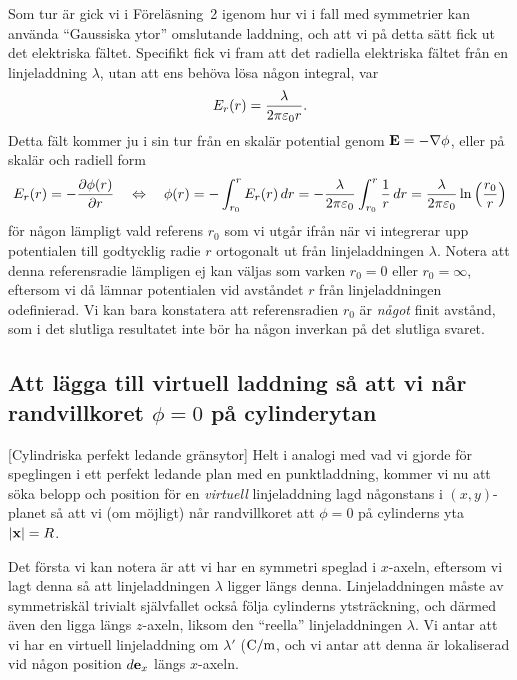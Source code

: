 {Som tur {\"a}r gick vi i F{\"o}rel{\"a}sning~2 igenom hur vi i fall med
symmetrier kan anv{\"a}nda ``Gaussiska ytor'' omslutande laddning, och att vi
p{\aa} detta s{\"a}tt fick ut det elektriska f{\"a}ltet. Specifikt fick vi fram
att det radiella elektriska f{\"a}ltet fr{\aa}n en linjeladdning $\lambda$,
utan att ens beh{\"o}va l{\"o}sa n{\aa}gon integral, var
$$
  E_r(r) = {{\lambda}\over{2\pi \varepsilon_0 r}}.
$$
Detta f{\"a}lt kommer ju i sin tur fr{\aa}n en skal{\"a}r potential genom
${\bf E}=-\nabla\phi$, eller p{\aa} skal{\"a}r och radiell form
$$
  E_r(r)=-{{\partial\phi(r)}\over{\partial r}}
    \quad\Leftrightarrow\quad
    \phi(r)=-\int^r_{r_0}E_r(r)\,dr
    =-{{\lambda}\over{2\pi \varepsilon_0}}\int^r_{r_0}{{1}\over{r}}\,dr
    ={{\lambda}\over{2\pi \varepsilon_0}}\ln\Big({{r_0}\over{r}}\Big)
$$
f{\"o}r n{\aa}gon l{\"a}mpligt vald referens $r_0$ som vi utg{\aa}r ifr{\aa}n
n{\"a}r vi integrerar upp potentialen till godtycklig radie $r$ ortogonalt ut
fr{\aa}n linjeladdningen $\lambda$. Notera att denna referensradie l{\"a}mpligen
ej kan v{\"a}ljas som varken $r_0=0$ eller $r_0=\infty$, eftersom vi d{\aa}
l{\"a}mnar potentialen vid avst{\aa}ndet $r$ fr{\aa}n linjeladdningen
odefinierad. Vi kan bara konstatera att referensradien $r_0$ {\"a}r
{\it n{\aa}got} finit avst{\aa}nd, som i det slutliga resultatet inte
b{\"o}r ha n{\aa}gon inverkan p{\aa} det slutliga svaret.

\subsection{Att l{\"a}gga till virtuell laddning s{\aa} att vi n{\aa}r
  randvillkoret $\phi=0$ p{\aa} cylinderytan}
[Cylindriska perfekt ledande gr{\"a}nsytor]
Helt i analogi med vad vi gjorde f{\"o}r speglingen i ett perfekt ledande plan
med en punktladdning, kommer vi nu att s{\"o}ka belopp och position f{\"o}r en
{\it virtuell} linjeladdning lagd n{\aa}gonstans i $(x,y)$-planet s{\aa} att vi
(om m{\"o}jligt) n{\aa}r randvillkoret att $\phi=0$ p{\aa} cylinderns yta
$|{\bf x}|=R$.

Det f{\"o}rsta vi kan notera {\"a}r att vi har en symmetri speglad i $x$-axeln,
eftersom vi lagt denna s{\aa} att linjeladdningen $\lambda$ ligger l{\"a}ngs
denna.
Linjeladdningen m{\aa}ste av symmetrisk{\"a}l trivialt sj{\"a}lvfallet ocks{\aa}
f{\"o}lja cylinderns ytstr{\"a}ckning, och d{\"a}rmed {\"a}ven den ligga
l{\"a}ngs $z$-axeln, liksom den ``reella'' linjeladdningen $\lambda$.
Vi antar att vi har en virtuell linjeladdning om $\lambda'$ (${\rm C}/{\rm m}$,
och vi antar att denna {\"a}r lokaliserad vid n{\aa}gon position $d{\bf e}_x$
l{\"a}ngs $x$-axeln.

}
